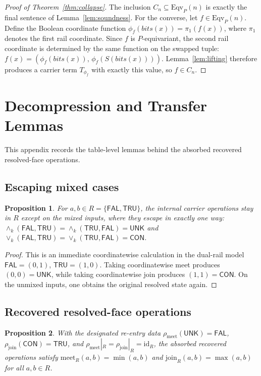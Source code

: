 \documentclass[11pt]{article}
\newtheorem{proposition}{Proposition}
\theoremstyle{remark}
\newcommand{\UNK}{\ensuremath{\mathsf{UNK}}}
\newcommand{\FAL}{\ensuremath{\mathsf{FAL}}}
\newcommand{\TRU}{\ensuremath{\mathsf{TRU}}}
\newcommand{\CON}{\ensuremath{\mathsf{CON}}}
\newcommand{\meetk}{\ensuremath{\wedge_k}}
\newcommand{\joink}{\ensuremath{\vee_k}}
\newcommand{\meetR}{\ensuremath{\mathrm{meet}_R}}
\newcommand{\joinR}{\ensuremath{\mathrm{join}_R}}
\newcommand{\Eqv}{\mathrm{Eqv}}
\newcommand{\bits}{\mathit{bits}}
\begin{document}
\begin{proof}[Proof of Theorem~\ref{thm:collapse}]
The inclusion $C_n\subseteq\Eqv_P(n)$ is exactly the final sentence of
Lemma~\ref{lem:soundness}. For the converse, let $f\in\Eqv_P(n)$. Define
the Boolean coordinate function $\phi_f(\bits(x))=\pi_1(f(x))$, where
$\pi_1$ denotes the first rail coordinate. Since $f$ is $P$-equivariant,
the second rail coordinate is determined by the same function on the
swapped tuple: $f(x)=(\phi_f(\bits(x)),\,\phi_f(S(\bits(x))))$.
Lemma~\ref{lem:lifting} therefore produces a carrier term $T_{\phi_f}$ with
exactly this value, so $f\in C_n$.
\end{proof}

\section{Decompression and Transfer Lemmas}

This appendix records the table-level lemmas behind the absorbed recovered
resolved-face operations.

\subsection{Escaping mixed cases}

\begin{proposition}\label{prop:C1}
For $a,b\in R=\{\FAL,\TRU\}$, the internal carrier operations stay in $R$
except on the mixed inputs, where they escape in exactly one way:
$\meetk(\FAL,\TRU)=\meetk(\TRU,\FAL)=\UNK$ and
$\joink(\FAL,\TRU)=\joink(\TRU,\FAL)=\CON$.
\end{proposition}

\begin{proof}
This is an immediate coordinatewise calculation in the dual-rail model
$\FAL=(0,1)$, $\TRU=(1,0)$. Taking coordinatewise meet produces
$(0,0)=\UNK$, while taking coordinatewise join produces $(1,1)=\CON$. On
the unmixed inputs, one obtains the original resolved state again.
\end{proof}

\subsection{Recovered resolved-face operations}

\begin{proposition}\label{prop:C2}
With the designated re-entry data $\rho_{\mathrm{meet}}(\UNK)=\FAL$,
$\rho_{\mathrm{join}}(\CON)=\TRU$, and
$\rho_{\mathrm{meet}}|_R=\rho_{\mathrm{join}}|_R=\mathrm{id}_R$, the
absorbed recovered operations satisfy $\meetR(a,b)=\min(a,b)$ and
$\joinR(a,b)=\max(a,b)$ for all $a,b\in R$.
\end{proposition}
\end{document}
